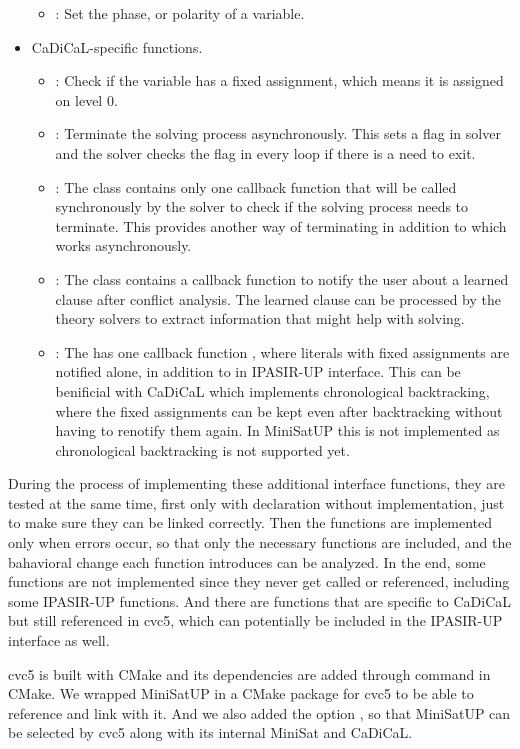 \begin{itemize}
\begin{itemize}
    \item {}: Set the phase, or polarity of a variable.
  \end{itemize}
  \item CaDiCaL-specific functions.
  \begin{itemize}
    \item {}: Check if the variable has a fixed assignment, which means it is assigned on level 0.
    \item {}: Terminate the solving process asynchronously. This sets a flag in solver and the solver checks the flag in every loop if there is a need to exit.
    \item {}: The  class contains only one callback function  that will be called synchronously by the solver to check if the solving process needs to terminate. This provides another way of terminating in addition to  which works asynchronously.
    \item {}: The  class contains a callback function  to notify the user about a learned clause after conflict analysis. The learned clause can be processed by the theory solvers to extract information that might help with solving.
    \item {}: The  has one callback function , where literals with fixed assignments are notified alone, in addition to  in IPASIR-UP interface. This can be benificial with CaDiCaL which implements chronological backtracking, where the fixed assignments can be kept even after backtracking without having to renotify them again. In MiniSatUP this is not implemented as chronological backtracking is not supported yet.
  \end{itemize}
\end{itemize}

During the process of implementing these additional interface functions, they are tested at the same time, first only with declaration without implementation, just to make sure they can be linked correctly. Then the functions are implemented only when errors occur, so that only the necessary functions are included, and the bahavioral change each function introduces can be analyzed. In the end, some functions are not implemented since they never get called or referenced, including some IPASIR-UP functions. And there are functions that are specific to CaDiCaL but still referenced in cvc5, which can potentially be included in the IPASIR-UP interface as well.

cvc5 is built with CMake and its dependencies are added through  command in CMake. We wrapped MiniSatUP in a CMake package for cvc5 to be able to reference and link with it. And we also added the option , so that MiniSatUP can be selected by cvc5 along with its internal MiniSat and CaDiCaL.
